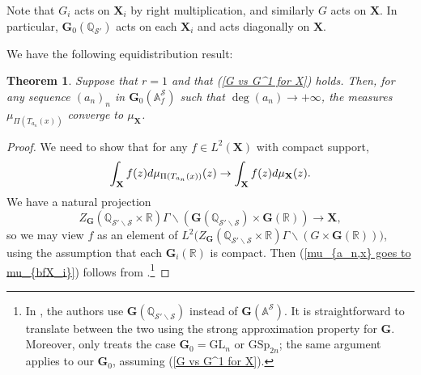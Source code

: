 \documentclass[11pt,oneside,reqno]{amsart}
\newcommand{\bfG}{\mathbf{G}}
\newcommand{\GL}{\mathrm{GL}}
\newcommand{\A}{\mathbb{A}}
\newcommand{\Q}{\mathbb{Q}}
\newcommand{\R}{\mathbb{R}}
\newcommand{\GSp}{\mathrm{GSp}}
\newcommand{\Scal}{\mathcal{S}}
\newcommand{\Gbf}{\mathbf{G}}
\newcommand{\bcS}{\mathcal{S}}
\newcommand{\bfX}{\mathbf{X}}
\theoremstyle{plain}
\newtheorem{theorem}{Theorem}[section]
\begin{document}
	
	
	
	
	
	
	Note that $G_i$ acts on $\bfX_i$ by right multiplication, and similarly $G$ acts on $\bfX$. In particular, $\bfG_0(\Q_{\bcS'})$ acts on each $\bfX_i$ and acts diagonally on $\bfX$.
	
	
	
	
	
	
	
	
	
	
	
	
	
	We have the following equidistribution result:
	\begin{theorem}\label{Equidisitrbution of Hecke points by Clozel-Oh-Ullmo}
		Suppose that $r=1$ and that (\ref{G vs G^1 for X}) holds. Then, for any sequence $(a_n)_n$ in $\bfG_0(\mathbb{A}_f^{\bcS})$ such that $\deg(a_n)\to +\infty$, the measures $\mu_{\Pi(T_{a_n}(x))}$ converge to $\mu_{\bfX}$.
	\end{theorem}
	\begin{proof}
		We need to show that for any $f\in L^2(\bfX)$ with compact support,
		\begin{equation}\label{mu_{a_n,x} goes to mu_{bfX_i}}
			\int_{\bfX}f(z)d\mu_{\Pi(T_{a_n}(x))}(z)
			\rightarrow
			\int_{\bfX}f(z)d\mu_{\bfX}(z).
		\end{equation}
		We have a natural projection
		\[
		Z_{\Gbf}(\Q_{{\bcS'}\backslash\bcS}\times\R)
		\Gamma\backslash(\Gbf(\Q_{{\bcS'}\backslash\bcS})\times\bfG(\R))
		\longrightarrow
		\bfX,
		\]
		so we may view $f$ as an element of $L^2\bigl(Z_{\Gbf}(\Q_{{\bcS'}\backslash\bcS}\times\R)\Gamma\backslash(G\times\bfG(\R))\bigr)$, using the assumption that each $\bfG_i(\R)$ is compact. Then (\ref{mu_{a_n,x} goes to mu_{bfX_i}}) follows from \cite[Theorem 1.7 and §4.7]{ClozelOhUllmo2001}.\footnote{In \cite{ClozelOhUllmo2001}, the authors use $\Gbf(\Q_{\Scal'\backslash\Scal})$ instead of $\Gbf(\A^\Scal)$. It is straightforward to translate between the two using the strong approximation property for $\Gbf$. Moreover, \cite[§4.7]{ClozelOhUllmo2001} only treats the case $\Gbf_0=\GL_n$ or $\GSp_{2n}$; the same argument applies to our $\Gbf_0$, assuming (\ref{G vs G^1 for X}).}
	\end{proof}
	
\end{document}
